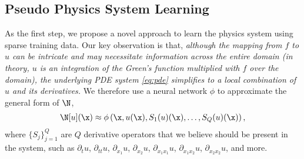 
\subsection{Pseudo Physics System Learning}\label{sect:phi}
As the first step, we propose a novel approach to learn the physics system using sparse training data. 
Our key observation is that, \textit{although the mapping from $f$ to $u$ can be intricate and may necessitate information across the entire domain (in theory, $u$ is an integration of the Green's function multiplied with $f$ over the domain), the underlying PDE system \eqref{eq:pde} simplifies to a local combination of $u$ and its derivatives.} We therefore use a neural network $\phi$ to approximate the general form of $\N$, 
\begin{align}
    \N[u](\x) \approx \phi\left(\x, u(\x), S_1(u)(\x), \ldots, S_Q(u)(\x)\right), \label{eq:pde-learn}
\end{align}
where  $\{S_j\}_{j=1}^Q$ are $Q$  derivative operators that we believe should be present in the system, such as $\partial_t u$, $\partial_{tt} u$, $\partial_{x_1} u$, $\partial_{x_2} u$,  
$\partial_{x_1x_1} u$, $\partial_{x_1x_2} u$, $\partial_{x_2x_2}u$, and more. 



